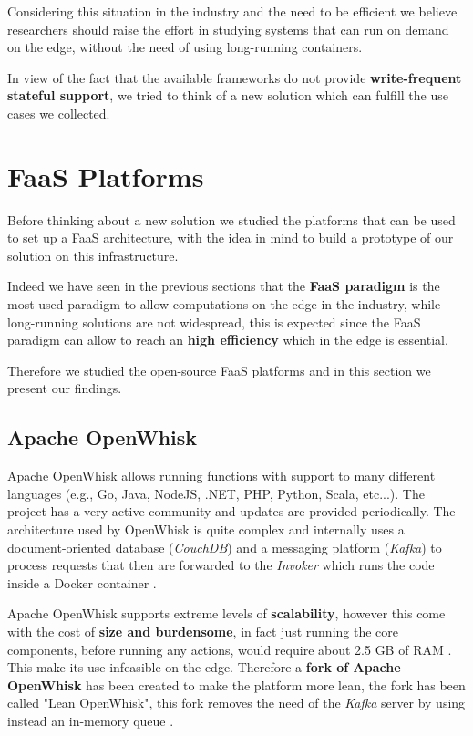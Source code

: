 Considering this situation in the industry and the need to be efficient we believe researchers should raise the effort in studying systems that can run on demand on the edge, without the need of using long-running containers.

In view of the fact that the available frameworks do not provide \textbf{write-frequent stateful support}, we tried to think of a new solution which can fulfill the use cases we collected.


\section{FaaS Platforms}
Before thinking about a new solution we studied the platforms that can be used to set up a FaaS architecture, with the idea in mind to build a prototype of our solution on this infrastructure.

Indeed we have seen in the previous sections that the \textbf{FaaS paradigm} is the most used paradigm to allow computations on the edge in the industry, while long-running solutions are not widespread, this is expected since the FaaS paradigm can allow to reach an \textbf{high efficiency} which in the edge is essential.

Therefore we studied the open-source FaaS platforms and in this section we present our findings.


\subsection{Apache OpenWhisk}
Apache OpenWhisk allows running functions with support to many different languages (e.g., Go, Java, NodeJS, .NET, PHP, Python, Scala, etc...). The project has a very active community and updates are provided periodically.
The architecture used by OpenWhisk is quite complex and internally uses a document-oriented database (\textit{CouchDB}) and a messaging platform (\textit{Kafka}) to process requests that then are forwarded to the \textit{Invoker} which runs the code inside a Docker container \cite{openwhisk-architecture}.

Apache OpenWhisk supports extreme levels of \textbf{scalability}, however this come with the cost of \textbf{size and burdensome}, in fact just running the core components, before running any actions, would require about 2.5 GB of RAM \cite{lean-openwhisk}. This make its use infeasible on the edge. Therefore a \textbf{fork of Apache OpenWhisk} has been created to make the platform more lean, the fork has been called "Lean OpenWhisk", this fork removes the need of the \textit{Kafka} server by using instead an in-memory queue \cite{lean-openwhisk}. 

